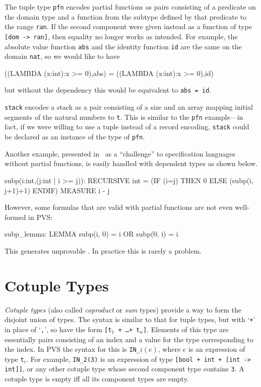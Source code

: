 The tuple type \texttt{pfn} encodes partial functions as pairs consisting
of a predicate on the domain type and a function from the subtype
defined by that predicate to the range \texttt{ran}.  If the second
component were given instead as a function of type \texttt{[dom -> ran]},
then equality no longer works as intended.  For example, the absolute
value function \texttt{abs} and the identity function \texttt{id} are the same
on the domain \texttt{nat}, so we would like to have
\begin{pvsex}
  ((LAMBDA (x:int):x >= 0),abs) = ((LAMBDA (x:int):x >= 0),id)
\end{pvsex}
%
but without the dependency this would be equivalent to \texttt{abs = id}.

\texttt{stack} encodes a stack as a pair consisting of a size and an array
mapping initial segments of the natural numbers to \texttt{t}.  This is
similar to the \texttt{pfn} example---in fact, if we were willing to use a
tuple instead of a record encoding, \texttt{stack} could be declared as an
instance of the type of \texttt{pfn}.

Another example, presented in~\cite{Cheng&Jones90} as a ``challenge'' to
specification languages without partial functions, is easily handled
with dependent types as shown below.
\begin{pvsex}
  subp(i:int,(j:int | i >= j)): RECURSIVE int =
       (IF (i=j) THEN 0 ELSE (subp(i, j+1)+1) ENDIF)
    MEASURE i - j
\end{pvsex}
However, some formulas that are valid with partial functions are not even
well-formed in PVS:
\begin{pvsex}
  subp_lemma: LEMMA subp(i, 0) = i OR subp(0, i) = i
\end{pvsex}
This generates unprovable \tccs.  In practice this is rarely a problem.

\section{Cotuple Types}\label{cotuple-types}

\emph{Cotuple types} (also called \emph{coproduct} or \emph{sum} types)
provide a way to form the disjoint union of types.  The syntax is similar
to that for tuple types, but with `\texttt{+}' in place of `\texttt{,}',
so have the form \texttt{[t$_1$ + \ldots + t$_n$]}.  Elements of this type
are essentially pairs consisting of an index and a value for the type
corresponding to the index.  In PVS the syntax for this is
\texttt{IN\_$i(e)$}, where $e$ is an expression of type \texttt{t$_i$}.
For example, \texttt{IN\_2(3)} is an expression of type \texttt{[bool + int
+ [int -> int]]}, or any other cotuple type whose second component type
contains \texttt{3}.  A cotuple type is empty iff all its component types
are empty.



